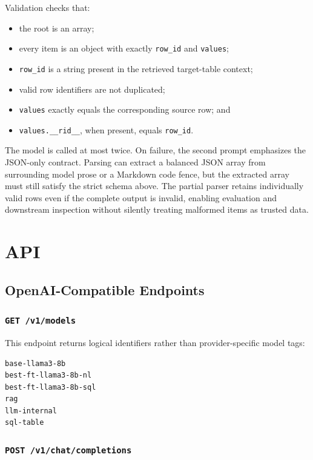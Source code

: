 \documentclass[11pt,a4paper]{article}
\newcommand{\code}[1]{\texttt{#1}}
\begin{document}
Validation checks that:

\begin{itemize}
  \item the root is an array;
  \item every item is an object with exactly \code{row\_id} and \code{values};
  \item \code{row\_id} is a string present in the retrieved target-table context;
  \item valid row identifiers are not duplicated;
  \item \code{values} exactly equals the corresponding source row; and
  \item \code{values.\_\_rid\_\_}, when present, equals \code{row\_id}.
\end{itemize}

The model is called at most twice. On failure, the second prompt emphasizes the
JSON-only contract. Parsing can extract a balanced JSON array from surrounding
model prose or a Markdown code fence, but the extracted array must still satisfy
the strict schema above. The partial parser retains individually valid rows even
if the complete output is invalid, enabling evaluation and downstream inspection
without silently treating malformed items as trusted data.

\section{API}

\subsection{OpenAI-Compatible Endpoints}

\subsubsection{\code{GET /v1/models}}

This endpoint returns logical identifiers rather than provider-specific model tags:

\begin{lstlisting}[style=codestyle]
base-llama3-8b
best-ft-llama3-8b-nl
best-ft-llama3-8b-sql
rag
llm-internal
sql-table
\end{lstlisting}

\subsubsection{\code{POST /v1/chat/completions}}
\end{document}
